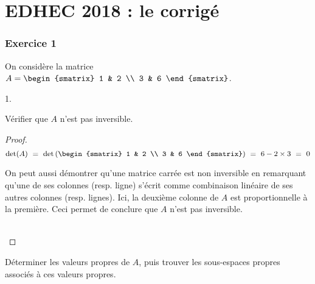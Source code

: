 \chapter*{EDHEC 2018 : le corrigé}
  
%


\subsection*{Exercice 1}

\noindent
On considère la matrice $A =
\begin{smatrix}
  1 & 2 \\
  3 & 6
\end{smatrix}
$.
\begin{noliste}{1.}
  \setlength{\itemsep}{4mm}
\item Vérifier que $A$ n'est pas inversible.

  \begin{proof}~%
    \[
    \det(A) \ = \ \det\left(
      \begin{smatrix}
        1 & 2 \\
        3 & 6
      \end{smatrix} 
    \right) %
    \ = \ 6 - 2 \times 3 \ = \ 0
    \]
    \begin{remark}%
      On peut aussi démontrer qu'une matrice carrée est non inversible
      en remarquant qu'une de ses colonnes (resp. ligne) s'écrit comme
      combinaison linéaire de ses autres colonnes (resp. lignes). Ici,
      la deuxième colonne de $A$ est proportionnelle à la
      première. Ceci permet de conclure que $A$ n'est pas inversible.
    \end{remark}~\\[-1.4cm]
  \end{proof}

\item Déterminer les valeurs propres de $A$, puis trouver les
  sous-espaces propres associés à ces valeurs propres.


\end{noliste}
